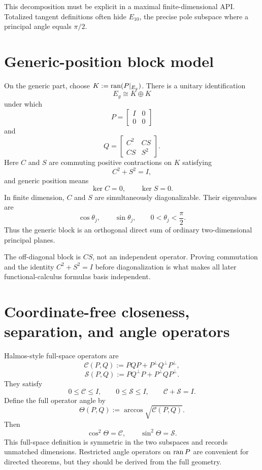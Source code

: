 This decomposition must be explicit in a maximal finite-dimensional API. Totalized tangent definitions often hide $E_{10}$, the precise pole subspace where a principal angle equals $\pi/2$.

\section{Generic-position block model}

On the generic part, choose $K:=\operatorname{ran}(P|_{E_g})$. There is a unitary identification
\[
  E_g\cong K\oplus K
\]
under which
\[
  P=\begin{bmatrix}I&0\\0&0\end{bmatrix}
\]
and
\[
  Q=\begin{bmatrix}
      C^2 & CS\\
      CS & S^2
    \end{bmatrix}.
\]
Here $C$ and $S$ are commuting positive contractions on $K$ satisfying
\[
  C^2+S^2=I,
\]
and generic position means
\[
  \ker C=0,
  \qquad
  \ker S=0.
\]
In finite dimension, $C$ and $S$ are simultaneously diagonalizable. Their eigenvalues are
\[
  \cos\theta_j,
  \qquad
  \sin\theta_j,
  \qquad 0<\theta_j<\frac\pi2.
\]
Thus the generic block is an orthogonal direct sum of ordinary two-dimensional principal planes.

\begin{remark}
The off-diagonal block is $CS$, not an independent operator. Proving commutation and the identity $C^2+S^2=I$ before diagonalization is what makes all later functional-calculus formulas basis independent.
\end{remark}

\section{Coordinate-free closeness, separation, and angle operators}

Halmos-style full-space operators are
\[
  \mathcal C(P,Q):=PQP+P^\perp Q^\perp P^\perp,
\]
\[
  \mathcal S(P,Q):=PQ^\perp P+P^\perp QP^\perp.
\]
They satisfy
\[
  0\le\mathcal C\le I,
  \qquad
  0\le\mathcal S\le I,
  \qquad
  \mathcal C+\mathcal S=I.
\]
Define the full operator angle by
\[
  \Theta(P,Q):=\arccos\sqrt{\mathcal C(P,Q)}.
\]
Then
\[
  \cos^2\Theta=\mathcal C,
  \qquad
  \sin^2\Theta=\mathcal S.
\]
This full-space definition is symmetric in the two subspaces and records unmatched dimensions. Restricted angle operators on $\operatorname{ran} P$ are convenient for directed theorems, but they should be derived from the full geometry.

